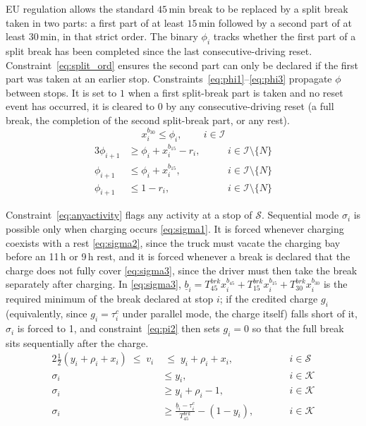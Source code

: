 EU regulation allows the standard $45$\,min break to be replaced by a split break taken in two parts: a first part of at least $15$\,min followed by a second part of at least $30$\,min, in that strict order. The binary $\phi_i$ tracks whether the first part of a split break has been completed since the last consecutive-driving reset. Constraint~\eqref{eq:split_ord} ensures the second part can only be declared if the first part was taken at an earlier stop. Constraints~\eqref{eq:phi1}--\eqref{eq:phi3} propagate $\phi$ between stops. It is set to $1$ when a first split-break part is taken and no reset event has occurred, it is cleared to $0$ by any consecutive-driving reset (a full break, the completion of the second split-break part, or any rest).
\begin{equation}
    x_i^{b_{30}} \leq \phi_i, \qquad \, i \in \mathcal{I} \label{eq:split_ord}
\end{equation}
\begin{alignat}{3}
    \phi_{i+1} &\geq \phi_i + x_i^{b_{15}} - r_i, &\quad& \, i \in \mathcal{I}\setminus\{N\} \label{eq:phi1}\\
    \phi_{i+1} &\leq \phi_i + x_i^{b_{15}}, &\quad& \, i \in \mathcal{I}\setminus\{N\} \label{eq:phi2}\\
    \phi_{i+1} &\leq 1 - r_i, &\quad& \, i \in \mathcal{I}\setminus\{N\} \label{eq:phi3}
\end{alignat}

Constraint~\eqref{eq:anyactivity} flags any activity at a stop of $\mathcal S$. Sequential mode $\sigma_i$ is possible only when charging occurs \eqref{eq:sigma1}. It is forced whenever charging coexists with a rest \eqref{eq:sigma2}, since the truck must vacate the charging bay before an 11\,h or 9\,h rest, and it is forced whenever a break is declared that the charge does not fully cover \eqref{eq:sigma3}, since the driver must then take the break separately after charging. In \eqref{eq:sigma3}, $\underline b_i = T^{brk}_{45}x^{b_{45}}_i + T^{brk}_{15}x^{b_{15}}_i + T^{brk}_{30}x^{b_{30}}_i$ is the required minimum of the break declared at stop $i$; if the credited charge $g_i$ (equivalently, since $g_i = \tau^c_i$ under parallel mode, the charge itself) falls short of it, $\sigma_i$ is forced to 1, and constraint~\eqref{eq:pi2} then sets $g_i = 0$ so that the full break sits sequentially after the charge.
\begin{alignat}{2}
    \tfrac{1}{2}(y_i + \rho_i + x_i) \;\leq\; v_i &\;\leq\; y_i + \rho_i + x_i, &\qquad& i \in \mathcal{S} \label{eq:anyactivity}\\
    \sigma_i &\leq y_i, &\qquad& i \in \mathcal{K} \label{eq:sigma1}\\
    \sigma_i &\geq y_i + \rho_i - 1, &\qquad& i \in \mathcal{K} \label{eq:sigma2}\\
    \sigma_i &\geq \frac{\underline b_i - \tau^c_i}{T^{brk}_{45}} - (1 - y_i), &\qquad& i \in \mathcal{K} \label{eq:sigma3}
\end{alignat}

